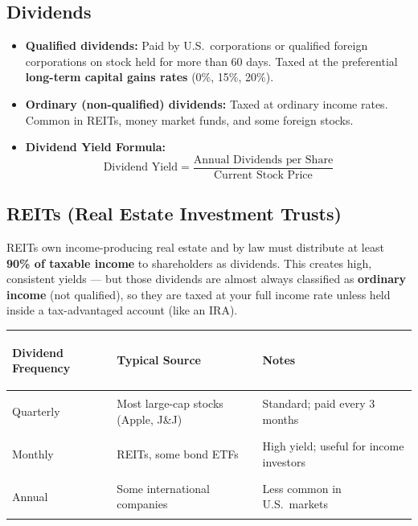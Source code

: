 \documentclass[11pt, letterpaper]{article}
\begin{document}
\subsection*{Dividends}

\begin{itemize}[noitemsep]
  \item \textbf{Qualified dividends:} Paid by U.S.\ corporations or qualified foreign corporations on stock held for more than 60 days. Taxed at the preferential \textbf{long-term capital gains rates} (0\%, 15\%, 20\%).
  \item \textbf{Ordinary (non-qualified) dividends:} Taxed at ordinary income rates. Common in REITs, money market funds, and some foreign stocks.
  \item \textbf{Dividend Yield Formula:}
  \[
    \text{Dividend Yield} = \frac{\text{Annual Dividends per Share}}{\text{Current Stock Price}}
  \]
\end{itemize}

\subsection*{REITs (Real Estate Investment Trusts)}

REITs own income-producing real estate and by law must distribute at least \textbf{90\% of taxable income} to shareholders as dividends. This creates high, consistent yields --- but those dividends are almost always classified as \textbf{ordinary income} (not qualified), so they are taxed at your full income rate unless held inside a tax-advantaged account (like an IRA).

\noindent
{\renewcommand{\arraystretch}{1.5}
\begin{tabularx}{\textwidth}{>{\bfseries\raggedright\arraybackslash}p{3.5cm}
                              >{\raggedright\arraybackslash}X
                              >{\raggedright\arraybackslash}X}
\toprule
\rowcolor{tableheaderteal}
\textbf{Dividend Frequency} & \textbf{Typical Source} & \textbf{Notes} \\
\midrule
\rowcolor{rowTe} Quarterly & Most large-cap stocks (Apple, J\&J) & Standard; paid every 3 months \\
\rowcolor{rowA}  Monthly   & REITs, some bond ETFs             & High yield; useful for income investors \\
\rowcolor{rowTe} Annual    & Some international companies      & Less common in U.S.\ markets \\
\bottomrule
\end{tabularx}}
\end{document}
